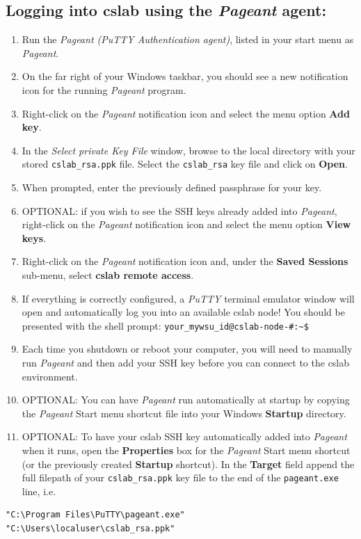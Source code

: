\documentclass[12pt]{article}
\begin{document}
\begin{flushleft}
\newpage
\subsection*{Logging into cslab using the \textit{Pageant} agent:}
\begin{enumerate}
  \item Run the \textit{Pageant (PuTTY Authentication agent)}, listed in your start menu as \textit{Pageant}.
  \item On the far right of your Windows taskbar, you should see a new notification icon for the running \textit{Pageant} program.
  \item Right-click on the \textit{Pageant} notification icon and select the menu option \textbf{Add key}.
  \item In the \textit{Select private Key File} window, browse to the local directory with your stored \verb|cslab_rsa.ppk| file. Select the \texttt{cslab\_rsa} key file and click on \textbf{Open}.
  \item When prompted, enter the previously defined passphrase for your key.
  \item OPTIONAL: if you wish to see the SSH keys already added into \textit{Pageant}, right-click on the \textit{Pageant} notification icon and select the menu option \textbf{View keys}.
  \item Right-click on the \textit{Pageant} notification icon and, under the \textbf{Saved Sessions} sub-menu, select \textbf{cslab remote access}.
  \item If everything is correctly configured, a \textit{PuTTY} terminal emulator window will open and automatically log you into an available cslab node! You should be presented with the shell prompt: 
    \verb|your_mywsu_id@cslab-node-#:~$|
  \item Each time you shutdown or reboot your computer, you will need to manually run \textit{Pageant} and then add your SSH key before you can connect to the cslab environment.
  \item OPTIONAL: You can have \textit{Pageant} run automatically at startup by copying the \textit{Pageant} Start menu shortcut file into your Windows \textbf{Startup} directory.
  \item OPTIONAL: To have your cslab SSH key automatically added into \textit{Pageant} when it runs, open the \textbf{Properties} box for the \textit{Pageant} Start menu shortcut (or the previously created \textbf{Startup} shortcut). In the \textbf{Target} field append the full filepath of your \verb|cslab_rsa.ppk| key file to the end of the \verb|pageant.exe| line, i.e.
\end{enumerate}
  \begin{verbatim}
"C:\Program Files\PuTTY\pageant.exe" "C:\Users\localuser\cslab_rsa.ppk"
  \end{verbatim}


\end{flushleft}
\end{document}
